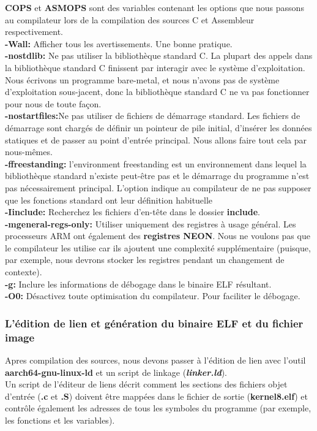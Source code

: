 \documentclass[12pt,a4paper,oneside]{book}
\begin{document}
	\textbf{COPS} et \textbf{ASMOPS} sont des variables contenant les options que nous passons au compilateur lors de la compilation des sources C et Assembleur respectivement.\\
	
	\textbf{-Wall:} Afficher tous les avertissements. Une bonne pratique.\\
	
	\textbf{-nostdlib:} Ne pas utiliser la bibliothèque standard C. La plupart des appels dans la bibliothèque standard C finissent par interagir avec le système d’exploitation. Nous écrivons un programme bare-metal, et nous n’avons pas de système d’exploitation sous-jacent, donc la bibliothèque standard C ne va pas fonctionner pour nous de toute façon.\\
	
	\textbf{-nostartfiles:}Ne pas utiliser de fichiers de démarrage standard. Les fichiers de démarrage sont chargés de définir un pointeur de pile initial, d’insérer les données statiques et de passer au point d’entrée principal. Nous allons faire tout cela par nous-mêmes.\\
	
	\textbf{-ffreestanding:} l'environment freestanding est un environnement dans lequel la bibliothèque standard n’existe peut-être pas et le démarrage du programme n’est pas nécessairement principal. L’option indique au compilateur de ne pas supposer que les fonctions standard ont leur définition habituelle\\
	
	\textbf{-Iinclude:}  Recherchez les fichiers d’en-tête dans le dossier \textbf{ include}.\\
	
	\textbf{-mgeneral-regs-only:} Utiliser uniquement des registres à usage général. Les processeurs ARM ont également des \textbf{registres NEON}. Nous ne voulons pas que le compilateur les utilise car ils ajoutent une complexité supplémentaire (puisque, par exemple, nous devrons stocker les registres pendant un changement de contexte).\\
	
	\textbf{-g:} Inclure les informations de débogage dans le binaire ELF résultant.\\
	
	\textbf{-O0:} Désactivez toute optimisation du compilateur. Pour faciliter le débogage.\\
	
	\subsubsection{L'édition de lien et génération du binaire ELF et du fichier image}
	Apres compilation des sources, nous devons passer à l'édition de lien avec l'outil \textbf{aarch64-gnu-linux-ld} et un script de linkage (\textit{\textbf{linker.ld}}).\\ 
	Un script de l’éditeur de liens décrit comment les sections des fichiers objet d’entrée (\textbf{.c} et \textbf{.S}) doivent être mappées dans le fichier de sortie (\textbf{kernel8.elf}) et contrôle également les adresses de tous les symboles du programme (par exemple, les fonctions et les variables).\\
	
\end{document}
